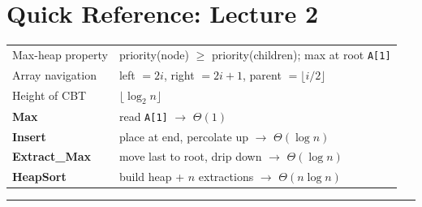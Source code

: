 \documentclass[11pt]{article}
\begin{document}
\section*{\textcolor{violetT}{Quick Reference: Lecture 2}}
\begin{keybox}
\renewcommand{\arraystretch}{1.35}
\begin{tabular}{l l}
Max-heap property & priority(node) $\ge$ priority(children); max at root \texttt{A[1]}\\
Array navigation & left $=2i$, \; right $=2i+1$, \; parent $=\lfloor i/2\rfloor$\\
Height of CBT & $\lfloor \log_2 n \rfloor$\\
\textbf{Max} & read \texttt{A[1]} $\to$ \textcolor{greenO}{$\Theta(1)$}\\
\textbf{Insert} & place at end, percolate up $\to$ \textcolor{violetT}{$\Theta(\log n)$}\\
\textbf{Extract\_Max} & move last to root, drip down $\to$ \textcolor{violetT}{$\Theta(\log n)$}\\
\textbf{HeapSort} & build heap + $n$ extractions $\to$ \textcolor{violetT}{$\Theta(n\log n)$}\\
\end{tabular}
\end{keybox}

\vspace{4pt}
\begin{center}\textcolor{greyline}{\rule{0.5\linewidth}{0.6pt}}\end{center}



\newpage
 


%
%       
%
%
%

\newpage
\end{document}
